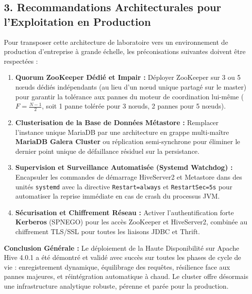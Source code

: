 \documentclass[11pt,a4paper]{article}
\begin{document}
\subsection*{3. Recommandations Architecturales pour l'Exploitation en Production}
Pour transposer cette architecture de laboratoire vers un environnement de production d'entreprise à grande échelle, les préconisations suivantes doivent être respectées :
\begin{enumerate}[leftmargin=1.2em, topsep=1.5pt, itemsep=1.5pt]
    \item \textbf{Quorum ZooKeeper Dédié et Impair :} Déployer ZooKeeper sur 3 ou 5 nœuds dédiés indépendants (au lieu d'un nœud unique partagé sur le master) pour garantir la tolérance aux pannes du moteur de coordination lui-même ($F = \frac{N-1}{2}$, soit 1 panne tolérée pour 3 nœuds, 2 pannes pour 5 nœuds).
    \item \textbf{Clusterisation de la Base de Données Métastore :} Remplacer l'instance unique MariaDB par une architecture en grappe multi-maître \textbf{MariaDB Galera Cluster} ou réplication semi-synchrone pour éliminer le dernier point unique de défaillance résiduel sur la persistance.
    \item \textbf{Supervision et Surveillance Automatisée (Systemd Watchdog) :} Encapsuler les commandes de démarrage HiveServer2 et Metastore dans des unités \texttt{systemd} avec la directive \texttt{Restart=always} et \texttt{RestartSec=5s} pour automatiser la reprise immédiate en cas de crash du processus JVM.
    \item \textbf{Sécurisation et Chiffrement Réseau :} Activer l'authentification forte \textbf{Kerberos} (SPNEGO) pour les accès ZooKeeper et HiveServer2, combinée au chiffrement TLS/SSL pour toutes les liaisons JDBC et Thrift.
\end{enumerate}

\textbf{Conclusion Générale :} Le déploiement de la Haute Disponibilité sur Apache Hive 4.0.1 a été démontré et validé avec succès sur toutes les phases de cycle de vie : enregistrement dynamique, équilibrage des requêtes, résilience face aux pannes majeures, et réintégration automatique à chaud. Le cluster offre désormais une infrastructure analytique robuste, pérenne et parée pour la production.
\end{document}
